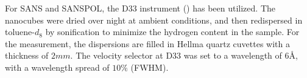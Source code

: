 \documentclass[\main/dresen_thesis.tex]{subfiles}
\begin{document}
    For SANS and SANSPOL, the D33 instrument () has been utilized.
    The nanocubes were dried over night at ambient conditions, and then redispersed in toluene-$\mathit{d_8}$ by sonification to minimize the hydrogen content in the sample.
    For the measurement, the dispersions are filled in Hellma quartz cuvettes with a thickness of $2 \unit{mm}$.
    The velocity selector at D33 was set to a wavelength of $6 \unit{\angstrom}$, with a wavelength spread of $10 \%$ (FWHM).


\end{document}
